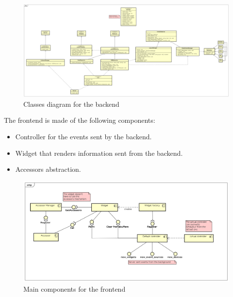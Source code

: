 \documentclass[12pt]{article}
\begin{document}
            \thispagestyle{empty}
            \begin{landscape}
                \begin{figure}[h]
                    \centering
                    \includegraphics[height=0.8\textheight]{classes}
                    \caption{Classes diagram for the backend}
                \end{figure}
            \end{landscape}
            \restoregeometry

            The frontend is made of the following components:

            \begin{itemize}
                \item Controller for the events sent by the backend.
                \item Widget that renders information sent from the backend.
                \item Accessors abstraction.
            \end{itemize}

            \begin{figure}[h]
                \centering
                \includegraphics[width=\textwidth]{frontend}
                \caption{Main components for the frontend}
            \end{figure}
\end{document}
